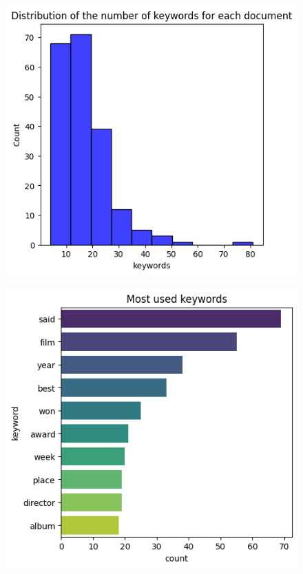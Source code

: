 \begin{figure}[H]
  \begin{minipage}{.5\textwidth}
    \centering
    \includegraphics[width=1\linewidth]{images/keyword_distribution.png}
    \label{fig:question4_1}
  \end{minipage}
  \begin{minipage}{.5\textwidth}
    \centering
    \includegraphics[width=1\linewidth]{images/keyword_distribution_ranks.png}
    \label{fig:question4_2}
  \end{minipage}
\end{figure}

